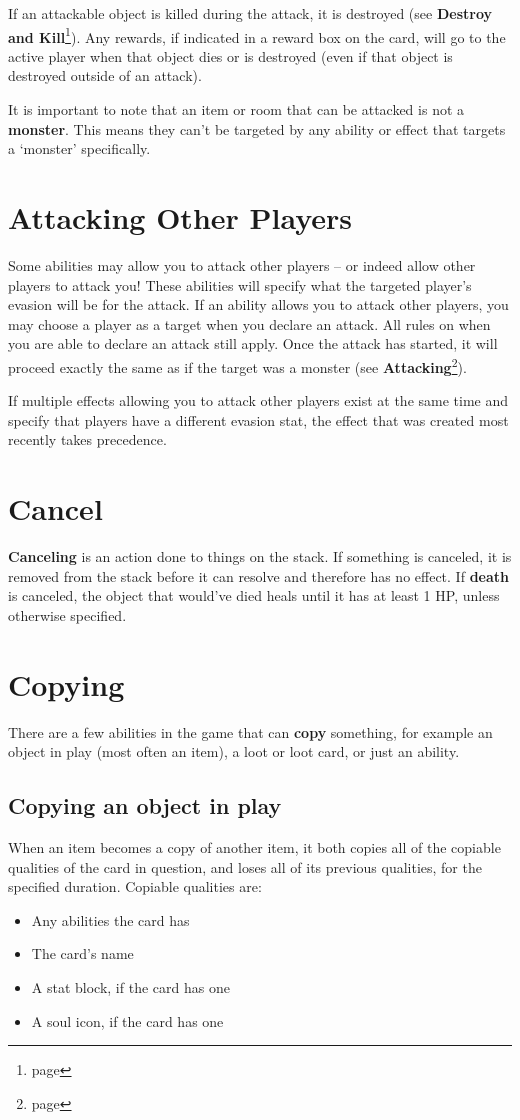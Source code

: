 \documentclass[a4paper, twoside]{report} %
\begin{document}
    If an attackable object is killed during the attack, it is destroyed (see \textbf{Destroy and Kill}\footnote{page \pageref{destroy}}). Any rewards, if indicated in a reward box on the card, will go to the active player when that object dies or is destroyed (even if that object is destroyed outside of an attack).

    It is important to note that an item or room that can be attacked is not a \textbf{monster}. This means they can’t be targeted by any ability or effect that targets a ‘monster’ specifically.
    \section{Attacking Other Players}
    Some abilities may allow you to attack other players – or indeed allow other players to attack you! These abilities will specify what the targeted player’s evasion will be for the attack. If an ability allows you to attack other players, you may choose a player as a target when you declare an attack. All rules on when you are able to declare an attack still apply. Once the attack has started, it will proceed exactly the same as if the target was a monster (see \textbf{Attacking}\footnote{page \pageref{attacking}}).

    If multiple effects allowing you to attack other players exist at the same time and specify that players have a different evasion stat, the effect that was created most recently takes precedence.
    \section{Cancel}
    \textbf{Canceling} is an action done to things on the stack. If something is canceled, it is removed from the stack before it can resolve and therefore has no effect. If \textbf{death} is canceled, the object that would’ve died heals until it has at least 1 HP, unless otherwise specified.
    \section{Copying}
    \label{copying}
    There are a few abilities in the game that can \textbf{copy} something, for example an object in play (most often an item), a loot or loot card, or just an ability.
    \subsection*{Copying an object in play}
    When an item becomes a copy of another item, it both copies all of the copiable qualities of the card in question, and loses all of its previous qualities, for the specified duration. Copiable qualities are:
    \begin{itemize}
        \item Any abilities the card has
        \item The card’s name
        \item A stat block, if the card has one
        \item A soul icon, if the card has one
    \end{itemize}
\end{document}
